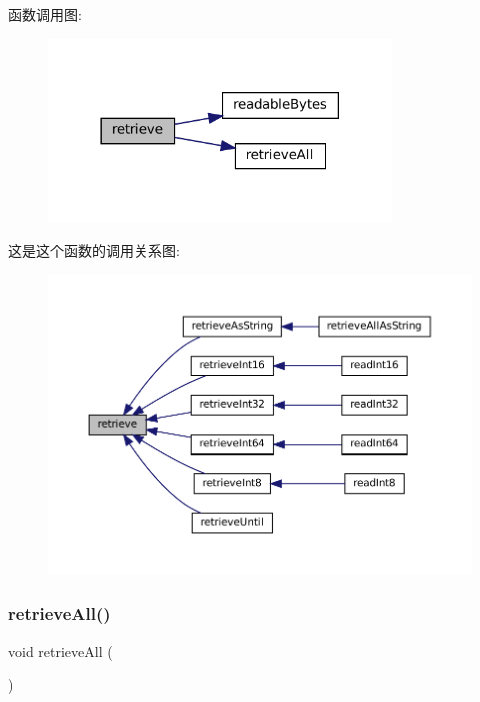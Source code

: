 函数调用图\+:
\nopagebreak
\begin{figure}[H]
\begin{center}
\leavevmode
\includegraphics[width=258pt]{classmuduo_1_1net_1_1Buffer_a25a9cdb4fcb89f6e3ff071517bdc09e8_cgraph}
\end{center}
\end{figure}
这是这个函数的调用关系图\+:
\nopagebreak
\begin{figure}[H]
\begin{center}
\leavevmode
\includegraphics[width=350pt]{classmuduo_1_1net_1_1Buffer_a25a9cdb4fcb89f6e3ff071517bdc09e8_icgraph}
\end{center}
\end{figure}
\mbox{\label{classmuduo_1_1net_1_1Buffer_af505ce71f8935bcfaa932d304c295173}} 
\subsubsection{\texorpdfstring{retrieve\+All()}{retrieveAll()}}
{\footnotesize\ttfamily void retrieve\+All (\begin{DoxyParamCaption}{ }\end{DoxyParamCaption})\hspace{0.3cm}{\ttfamily [inline]}}



